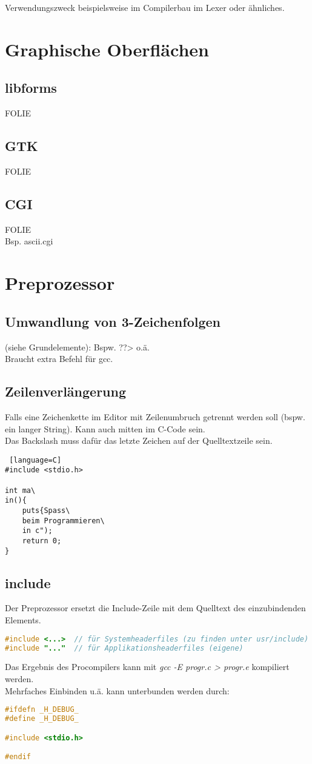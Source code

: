 Verwendungszweck beispielsweise im Compilerbau im Lexer oder ähnliches.

\chapter{Graphische Oberflächen}
\section{libforms}
FOLIE
\section{GTK}
FOLIE
\section{CGI}
FOLIE\\
Bsp. ascii.cgi

\chapter{Preprozessor}

\section{Umwandlung von 3-Zeichenfolgen}
(siehe Grundelemente): Bspw. ??> o.ä.\\
Braucht extra Befehl für gcc.

\section{Zeilenverlängerung}
Falls eine Zeichenkette im Editor mit Zeilenumbruch getrennt werden soll (bspw. ein langer String). Kann auch mitten im C-Code sein.\\
Das Backslash muss dafür das letzte Zeichen auf der Quelltextzeile sein.
\begin{lstlisting} [language=C]
#include <stdio.h>

int ma\
in(){
	puts{Spass\
	beim Programmieren\
	in c");
	return 0;
}
\end{lstlisting}

\section{include}

Der Preprozessor ersetzt die Include-Zeile mit dem Quelltext des einzubindenden Elements.
\begin{lstlisting}[language=C]
#include <...>	// für Systemheaderfiles (zu finden unter usr/include)
#include "..."	// für Applikationsheaderfiles (eigene)
\end{lstlisting}
Das Ergebnis des Procompilers kann mit \emph{gcc -E progr.c > progr.e} kompiliert werden.\\
Mehrfaches Einbinden u.ä. kann unterbunden werden durch:
\begin{lstlisting}[language=C]
#ifdefn _H_DEBUG_
#define _H_DEBUG_

#include <stdio.h>

#endif
\end{lstlisting}

